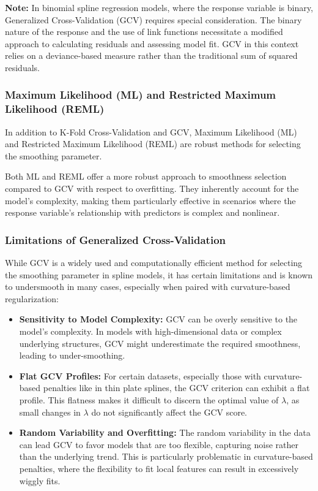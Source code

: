 \documentclass[12pt, twoside,hidelinks]{article}
\theoremstyle{definition}
\numberwithin{equation}{section}
\begin{document}
\textbf{Note:} In binomial spline regression models, where the response variable is binary, Generalized Cross-Validation (GCV) requires special consideration. The binary nature of the response and the use of link functions necessitate a modified approach to calculating residuals and assessing model fit. GCV in this context relies on a deviance-based measure rather than the traditional sum of squared residuals.


\subsubsection{Maximum Likelihood (ML) and Restricted Maximum Likelihood (REML)}
In addition to K-Fold Cross-Validation and GCV, Maximum Likelihood (ML) and Restricted Maximum Likelihood (REML) are robust methods for selecting the smoothing parameter.

Both ML and REML offer a more robust approach to smoothness selection compared to GCV with respect to overfitting. They inherently account for the model's complexity, making them particularly effective in scenarios where the response variable's relationship with predictors is complex and nonlinear.

\subsubsection{Limitations of Generalized Cross-Validation}
While GCV is a widely used and computationally efficient method for selecting the smoothing parameter in spline models, it has certain limitations and is known to undersmooth in many cases, especially when paired with curvature-based regularization:
\newline

\begin{itemize}
    \item \textbf{Sensitivity to Model Complexity:} GCV can be overly sensitive to the model's complexity. In models with high-dimensional data or complex underlying structures, GCV might underestimate the required smoothness, leading to under-smoothing.
    
    \item \textbf{Flat GCV Profiles:} For certain datasets, especially those with curvature-based penalties like in thin plate splines, the GCV criterion can exhibit a flat profile. This flatness makes it difficult to discern the optimal value of \(\lambda\), as small changes in \(\lambda\) do not significantly affect the GCV score.
    
    \item \textbf{Random Variability and Overfitting:} The random variability in the data can lead GCV to favor models that are too flexible, capturing noise rather than the underlying trend. This is particularly problematic in curvature-based penalties, where the flexibility to fit local features can result in excessively wiggly fits.
\end{itemize}
\end{document}
